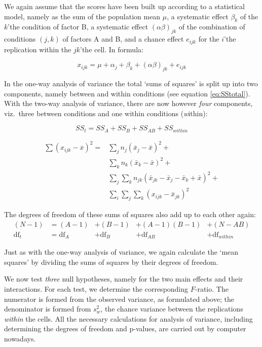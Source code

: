 \documentclass[
]{book}
\begin{document}
We again assume that the scores have been built up according to
a statistical model, namely as the sum of the population mean
\(\mu\), a systematic effect \(\beta_k\) of the \(k\)'the condition of
factor B, a systematic effect \((\alpha\beta)_{jk}\) of the combination
of conditions \((j,k)\) of factors A and B, and a chance effect
\(e_{ijk}\) for the \(i\)'the replication within the \(jk\)'the cell. In formula:

\[x_{ijk} = \mu + \alpha_{j} + \beta_{k} + (\alpha\beta)_{jk} + e_{ijk}\]

In the one-way analysis of variance the total `sums of squares' is split up
into two components, namely between and within conditions (see
equation \eqref{eq:SStotal}).
With the two-way analysis of variance, there are now however
\emph{four} components,
viz.~three between conditions and one within conditions (\emph{w}ithin):

\begin{equation}
  \label{eq:SStotal2way-short}
    { SS_t } = SS_A + SS_B + SS_{AB} + SS_{within} 
\end{equation}

\begin{align}
  \label{eq:SStotal2way}
    { \sum (x_{ijk} - \overline{x})^2 } = &  { \sum_j n_j (\bar{x}_j - \bar{x})^2 } + \\ 
    & { \sum_k n_k (\bar{x}_k - \bar{x})^2 } +  \\
    & { \sum_j \sum_k n_{jk} (\bar{x}_{jk} - \bar{x}_j - \bar{x}_k + \bar{x})^2 } + \\
    & { \sum_i \sum_j \sum_k (x_{ijk} - \bar{x}_{jk})^2 } 
\end{align}

The degrees of freedom of these sums of squares also add up to each other
again:
\begin{align}
  \label{eq:dftotal2}
    { (N-1) } &= (A-1) &+ (B-1) &+ (A-1)(B-1) &+ (N-AB) \\
    \textrm{df}_t &= \textrm{df}_A &+ \textrm{df}_B &+ \textrm{df}_{AB} &+ \textrm{df}_{within}
\end{align}

Just as with the one-way analysis of variance, we again calculate the
`mean squares' by dividing the sums of squares by their degrees of freedom.

We now test \emph{three} null hypotheses, namely for the two main effects and their
interactions. For each test, we determine the corresponding
\(F\)-ratio. The numerator is formed from the observed variance,
as formulated above; the denominator is formed from \(s^2_w\), the
chance variance between the replications \emph{within} the cells. All
the necessary calculations for analysis of variance, including determining
the degrees of freedom and p-values, are carried out by computer
nowadays.
\end{document}
